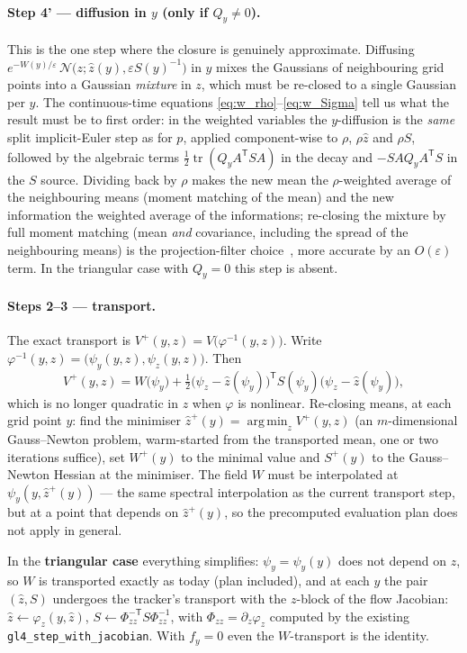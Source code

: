 \documentclass[11pt,a4paper]{article}
\newcommand{\tr}{\operatorname{tr}}
\newcommand{\argmin}{\operatorname{arg\,min}}
\newcommand{\T}{^{\mathsf T}}
\newcommand{\zh}{\hat{z}}
\newcommand{\eps}{\varepsilon}
\theoremstyle{plain}
\theoremstyle{definition}
\theoremstyle{remark}
\begin{document}
\paragraph{Step 4' --- diffusion in $y$ (only if $Q_y\ne0$).}
This is the one step where the closure is genuinely approximate. Diffusing $e^{-W(y)/\eps}\,\mathcal N\big(z;\zh(y),\eps S(y)^{-1}\big)$ in $y$ mixes the Gaussians of neighbouring grid points into a Gaussian \emph{mixture} in $z$, which must be re-closed to a single Gaussian per $y$. The continuous-time equations \eqref{eq:w_rho}--\eqref{eq:w_Sigma} tell us what the result must be to first order: in the weighted variables the $y$-diffusion is the \emph{same} split implicit-Euler step as for $p$, applied component-wise to $\rho$, $\rho\zh$ and $\rho S$, followed by the algebraic terms $\tfrac12\tr(Q_yA\T SA)$ in the decay and $-SAQ_yA\T S$ in the $S$ source. Dividing back by $\rho$ makes the new mean the $\rho$-weighted average of the neighbouring means (moment matching of the mean) and the new information the weighted average of the informations; re-closing the mixture by full moment matching (mean \emph{and} covariance, including the spread of the neighbouring means) is the projection-filter choice~\cite{Brigo1998}, more accurate by an $O(\eps)$ term. In the triangular case with $Q_y=0$ this step is absent.

\paragraph{Steps 2--3 --- transport.}
The exact transport is $V^+(y,z) = V\big(\varphi^{-1}(y,z)\big)$. Write $\varphi^{-1}(y,z) = \big(\psi_y(y,z),\psi_z(y,z)\big)$. Then
\[
  V^+(y,z) = W\big(\psi_y\big) + \tfrac12\big(\psi_z - \zh(\psi_y)\big)\T S(\psi_y)\big(\psi_z - \zh(\psi_y)\big),
\]
which is no longer quadratic in $z$ when $\varphi$ is nonlinear. Re-closing means, at each grid point $y$: find the minimiser $\zh^+(y)=\argmin_z V^+(y,z)$ (an $m$-dimensional Gauss--Newton problem, warm-started from the transported mean, one or two iterations suffice), set $W^+(y)$ to the minimal value and $S^+(y)$ to the Gauss--Newton Hessian at the minimiser. The field $W$ must be interpolated at $\psi_y(y,\zh^+(y))$ --- the same spectral interpolation as the current transport step, but at a point that depends on $\zh^+(y)$, so the precomputed evaluation plan does not apply in general.

In the \textbf{triangular case} everything simplifies: $\psi_y = \psi_y(y)$ does not depend on $z$, so $W$ is transported exactly as today (plan included), and at each $y$ the pair $(\zh,S)$ undergoes the tracker's transport with the $z$-block of the flow Jacobian: $\zh\leftarrow\varphi_z(y,\zh)$, $S\leftarrow\Phi_{zz}^{-\mathsf T}S\Phi_{zz}^{-1}$, with $\Phi_{zz}=\partial_z\varphi_z$ computed by the existing \texttt{gl4\_step\_with\_jacobian}. With $f_y=0$ even the $W$-transport is the identity.
\end{document}
